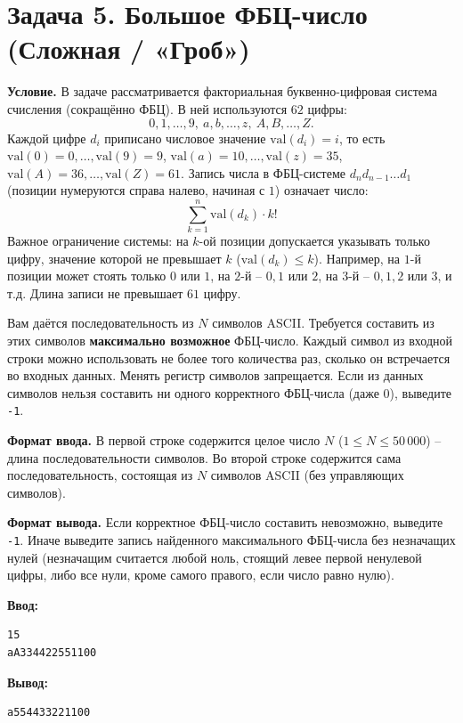 \section*{Задача 5. Большое ФБЦ-число (Сложная / «Гроб»)}
\textbf{Условие.} В задаче рассматривается факториальная буквенно-цифровая система счисления (сокращённо ФБЦ). В ней используются $62$ цифры: 
$$0, 1, \dots, 9,\ a, b, \dots, z,\ A, B, \dots, Z.$$
Каждой цифре $d_i$ приписано числовое значение $\text{val}(d_i) = i$, то есть $\text{val}(0)=0, \dots, \text{val}(9)=9$, $\text{val}(a)=10, \dots, \text{val}(z)=35$, $\text{val}(A)=36, \dots, \text{val}(Z)=61$. 
Запись числа в ФБЦ-системе $d_n d_{n-1} \dots d_1$ (позиции нумеруются справа налево, начиная с $1$) означает число:
$$ \sum_{k=1}^{n} \text{val}(d_k) \cdot k! $$
Важное ограничение системы: на $k$-ой позиции допускается указывать только цифру, значение которой не превышает $k$ ($\text{val}(d_k) \le k$). Например, на $1$-й позиции может стоять только $0$ или $1$, на $2$-й -- $0, 1$ или $2$, на $3$-й -- $0, 1, 2$ или $3$, и т.д. Длина записи не превышает $61$ цифру.

Вам даётся последовательность из $N$ символов ASCII. Требуется составить из этих символов \textbf{максимально возможное} ФБЦ-число. Каждый символ из входной строки можно использовать не более того количества раз, сколько он встречается во входных данных. Менять регистр символов запрещается. Если из данных символов нельзя составить ни одного корректного ФБЦ-числа (даже $0$), выведите \texttt{-1}.

\textbf{Формат ввода.} В первой строке содержится целое число $N$ ($1 \le N \le 50\,000$) -- длина последовательности символов. Во второй строке содержится сама последовательность, состоящая из $N$ символов ASCII (без управляющих символов).

\textbf{Формат вывода.} Если корректное ФБЦ-число составить невозможно, выведите \texttt{-1}. Иначе выведите запись найденного максимального ФБЦ-числа без незначащих нулей (незначащим считается любой ноль, стоящий левее первой ненулевой цифры, либо все нули, кроме самого правого, если число равно нулю).

\begin{examplebox}
  \begin{minipage}[t]{0.48\linewidth}
    \textbf{Ввод:}\\
    \begin{verbatim}
15
aA334422551100
    \end{verbatim}
  \end{minipage}%
  \hfill%
  \begin{minipage}[t]{0.48\linewidth}
    \textbf{Вывод:}\\
    \begin{verbatim}
a554433221100
    \end{verbatim}
  \end{minipage}
\end{examplebox}

